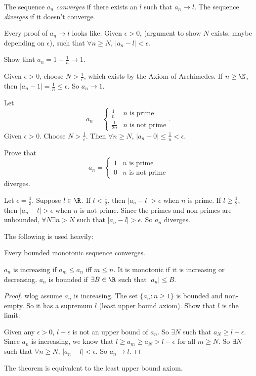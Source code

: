 \documentclass[a4paper]{article}
\begin{document}
  \begin{defi}
    The sequence $a_n$ \emph{converges} if there exists an $l$ such that $a_n\to l$. The sequence \emph{diverges} if it doesn't converge.
  \end{defi}

  Every proof of $a_n \to l$ looks like: Given $\epsilon > 0$, (argument to show $N$ exists, maybe depending on $\epsilon$), such that $\forall n\geq N$, $|a_n - l| < \epsilon$.
  \begin{eg}
    Show that $a_n = 1 - \frac{1}{n} \to 1$.

    Given $\epsilon > 0$, choose $N > \frac{1}{\epsilon}$, which exists by the Axiom of Archimedes. If $n \geq \N$, then $|a_n - 1| = \frac{1}{n} \leq \epsilon$. So $a_n\to 1$.
  \end{eg}

  \begin{eg}
    Let 
    \[
      a_n = \begin{cases}\frac{1}{n} & n\text{ is prime}\\ \frac{1}{2n} & n\text{ is not prime}\end{cases}.
    \]
    Given $\epsilon > 0$. Choose $N > \frac{1}{\epsilon}$. Then $\forall n\geq N$, $|a_n - 0| \leq \frac{1}{n} < \epsilon$.
  \end{eg}

  \begin{eg}
    Prove that 
    \[
      a_n = \begin{cases}1 & n\text{ is prime}\\ 0 & n\text{ is not prime}\end{cases}
    \]
    diverges.

    Let $\epsilon = \frac{1}{3}$. Suppose $l\in \R$. If $l < \frac{1}{2}$, then $|a_n - l| > \epsilon$ when $n$ is prime. If $l\geq \frac{1}{2}$, then $|a_n - l| > \epsilon$ when $n$ is not prime. Since the primes and non-primes are unbounded, $\forall N\exists n > N$ such that $|a_n - l| > \epsilon$. So $a_n$ diverges.
  \end{eg}


  The following is used heavily:
  \begin{thm}
    Every bounded monotonic sequence converges.
  \end{thm}
  \note $a_n$ is increasing if $a_m \leq a_n$ iff $m \leq n$. It is monotonic if it is increasing or decreasing. $a_n$ is bounded if $\exists B\in \R$ such that $|a_n| \leq B$.

  \begin{proof}
    wlog assume $a_n$ is increasing. The set $\{a_n: n\geq 1\}$ is bounded and non-empty. So it has a supremum $l$ (least upper bound axiom). Show that $l$ is the limit:

    Given any $\epsilon >0$, $l - \epsilon$ is not an upper bound of $a_n$. So $\exists N$ such that $a_N \geq l - \epsilon$. Since $a_n$ is increasing, we know that $l \geq a_m \geq a_N > l - \epsilon$ for all $m \geq N$. So $\exists N $ such that $\forall n\geq N$, $|a_n - l| < \epsilon$. So $a_n \to l$.
  \end{proof}
  \note The theorem is equivalent to the least upper bound axiom.
\end{document}
